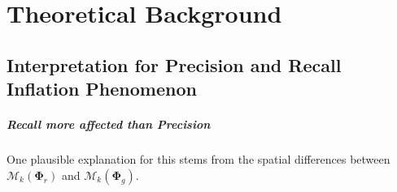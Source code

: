 










%                    
%                    

\appendix

\chapter{Theoretical Background}

\section{Interpretation for Precision and Recall Inflation Phenomenon}
\label{app:fpr_inflation}

\paragraph{Recall more affected than Precision}
One plausible explanation for this stems from the spatial differences between $\mathcal{M}_k(\boldsymbol\Phi_r)$ and $\mathcal{M}_k(\boldsymbol\Phi_g)$. 

